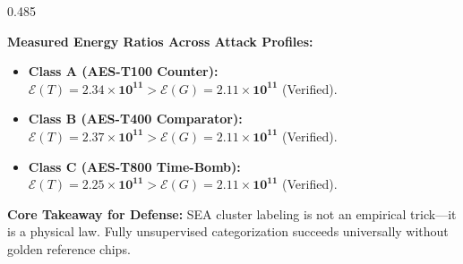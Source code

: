 \documentclass[aspectratio=169,11pt]{beamer}
\begin{document}
\begin{frame}[t]
\begin{columns}[T, onlytextwidth]
    \begin{column}{0.485\textwidth}
      \begin{glassbox}[top=2pt, bottom=2pt, left=6pt, right=6pt, title={Empirical Proof Across Threat Classes}]{}
        \textbf{Measured Energy Ratios Across Attack Profiles:}
        \begin{itemize}\setlength{\itemsep}{1.2pt}
          \item \textbf{Class A (AES-T100 Counter):}
            $\mathcal{E}(T) = \mathbf{2.34 \times 10^{11}} > \mathcal{E}(G) = \mathbf{2.11 \times 10^{11}}$ (Verified).
          \item \textbf{Class B (AES-T400 Comparator):}
            $\mathcal{E}(T) = \mathbf{2.37 \times 10^{11}} > \mathcal{E}(G) = \mathbf{2.11 \times 10^{11}}$ (Verified).
          \item \textbf{Class C (AES-T800 Time-Bomb):}
            $\mathcal{E}(T) = \mathbf{2.25 \times 10^{11}} > \mathcal{E}(G) = \mathbf{2.11 \times 10^{11}}$ (Verified).
        \end{itemize}
        \vspace{1pt}
        \textbf{Core Takeaway for Defense:}
        SEA cluster labeling is not an empirical trick—it is a physical law. Fully unsupervised categorization succeeds universally without golden reference chips.
      \end{glassbox}
    \end{column}
  \end{columns}
\end{frame}
\end{document}
